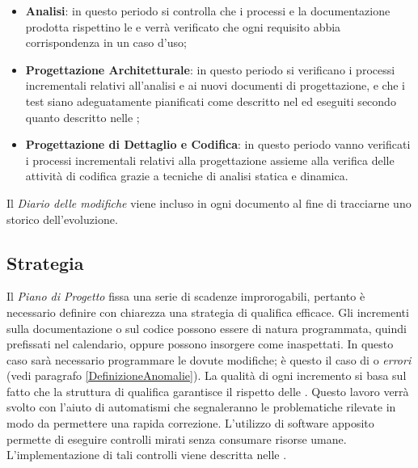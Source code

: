 	\begin{itemize}
		\item \textbf{Analisi}: in questo periodo si controlla che i processi e la documentazione prodotta rispettino le \NormeDiProgetto{} e verrà verificato che ogni requisito abbia corrispondenza in un caso d’uso;
		\item \textbf{Progettazione Architetturale}: in questo periodo si verificano i processi incrementali relativi all'analisi e ai nuovi documenti di progettazione, e che i test siano adeguatamente pianificati come descritto nel \PianoDiProgetto{} ed eseguiti secondo quanto descritto nelle \NormeDiProgetto;
		\item \textbf{Progettazione di Dettaglio e Codifica}: in questo periodo vanno verificati i processi incrementali relativi alla progettazione assieme alla verifica delle attività di codifica grazie a tecniche di analisi statica e dinamica.
	\end{itemize}
	
	Il \emph{Diario delle modifiche} viene incluso in ogni documento al fine di tracciarne uno storico dell'evoluzione.
	
	\subsection{Strategia}

		Il \emph{Piano di Progetto} fissa una serie di scadenze improrogabili, pertanto è necessario definire con chiarezza una strategia di qualifica efficace. Gli incrementi sulla documentazione o sul codice possono essere di natura programmata, quindi prefissati nel calendario, oppure possono insorgere come inaspettati. In questo caso sarà necessario programmare le dovute modifiche; è questo il caso di  o \emph{errori} (vedi paragrafo \ref{DefinizioneAnomalie}). La qualità di ogni incremento si basa sul fatto che la struttura di qualifica garantisce il rispetto delle  \NormeDiProgetto{}. Questo lavoro verrà svolto con l'aiuto di automatismi che segnaleranno le problematiche rilevate in modo da permettere una rapida correzione. L'utilizzo di software apposito permette di eseguire controlli mirati senza consumare risorse umane. L'implementazione di tali controlli viene descritta nelle \NormeDiProgetto{}.
			

